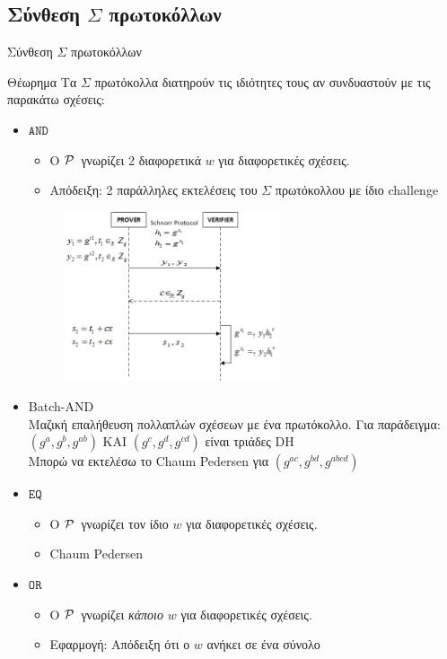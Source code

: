 \documentclass[10pt,handout]{beamer}
\begin{document}
\subsection{Σύνθεση $\Sigma$ πρωτοκόλλων}
\begin{frame}[allowframebreaks]{Σύνθεση $\Sigma$ πρωτοκόλλων}
\begin{block}{Θέωρημα} 
Τα $\Sigma$ πρωτόκολλα διατηρούν τις ιδιότητες τους αν συνδυαστούν με τις παρακάτω σχέσεις:
\end{block}
\begin{itemize}
\item $\mathtt{AND}$
\begin{itemize}
\item O $\mathcal{P}\,$ γνωρίζει 2 διαφορετικά $w$ για διαφορετικές σχέσεις.
\item Απόδειξη: 2 παράλληλες εκτελέσεις του  $\Sigma$ πρωτόκολλου με ίδιο challenge
\end{itemize}
\begin{figure}
\centering
\includegraphics[width=0.6\textwidth]{schnorrand.png}
\end{figure}
\framebreak
\item Batch-AND\\
Μαζική επαλήθευση πολλαπλών σχέσεων με ένα πρωτόκολλο.
Για παράδειγμα: \\ 
$(g^a, g^b, g^{ab})$ ΚΑΙ  $(g^c, g^d, g^{cd})$ είναι τριάδες DH\\
Μπορώ να εκτελέσω το Chaum Pedersen για $(g^{ac}, g^{bd}, g^{abcd})$
\item $\mathtt{EQ}$
\begin{itemize}
\item O $\mathcal{P}\,$ γνωρίζει τον ίδιο $w$ για διαφορετικές σχέσεις.
\item Chaum Pedersen
\end{itemize}
\item $\mathtt{OR}$
\begin{itemize}
\item O $\mathcal{P}\,$ γνωρίζει \emph{κάποιο} $w$ για διαφορετικές σχέσεις.
\item Εφαρμογή: Απόδειξη ότι ο $w$ ανήκει σε ένα σύνολο
\end{itemize}
\end{itemize} 
\end{frame}
\end{document}
